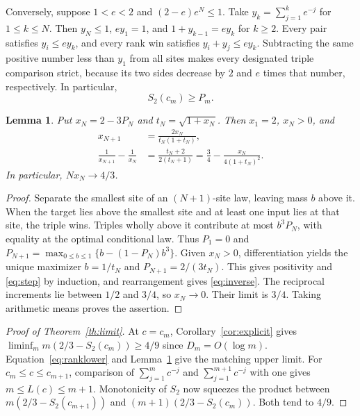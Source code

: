 \documentclass[11pt,reqno]{amsart}
\newtheorem{lemma}[theorem]{Lemma}
\begin{document}
Conversely, suppose $1<e<2$ and $(2-e)e^N\le1$. Take
$y_k=\sum_{j=1}^k e^{-j}$ for $1\le k\le N$. Then $y_N\le1$,
$e y_1=1$, and $1+y_{k-1}=e y_k$ for $k\ge2$.
Every pair satisfies $y_i\le e y_k$, and every rank win satisfies
$y_i+y_j\le e y_k$. Subtracting the same positive number less than
$y_1$ from all sites makes every designated triple comparison strict,
because its two sides decrease by $2$ and $e$ times that number,
respectively. In particular,
\begin{equation}\label{eq:ranklower}
 S_2(c_m)\ge P_m.
\end{equation}

\begin{lemma}\label{lem:rec}
Put $x_N=2-3P_N$ and $t_N=\sqrt{1+x_N}$. Then $x_1=2$,
$x_N>0$, and
\begin{align}
 x_{N+1}&=\frac{2x_N}{t_N(1+t_N)},\label{eq:step}\\
 \frac1{x_{N+1}}-\frac1{x_N}
  &=\frac{t_N+2}{2(t_N+1)}
   =\frac34-\frac{x_N}{4(1+t_N)^2}.\label{eq:inverse}
\end{align}
In particular, $Nx_N\longrightarrow 4/3$.
\end{lemma}
\begin{proof}
Separate the smallest site of an $(N+1)$-site law, leaving mass $b$
above it. When the target lies above the smallest site and at least one
input lies at that site, the triple wins. Triples wholly above it
contribute at most $b^3P_N$, with equality at the optimal conditional law.
Thus $P_1=0$ and
$P_{N+1}=\max_{0\le b\le1}\{b-(1-P_N)b^3\}$.
Given $x_N>0$, differentiation yields the unique maximizer
$b=1/t_N$ and $P_{N+1}=2/(3t_N)$. This gives positivity and
\eqref{eq:step} by induction, and rearrangement gives \eqref{eq:inverse}.
The reciprocal increments lie between $1/2$ and $3/4$, so $x_N\to0$.
Their limit is $3/4$. Taking arithmetic means proves the assertion.
\end{proof}

\begin{proof}[Proof of Theorem~\ref{th:limit}]
At $c=c_m$, Corollary~\ref{cor:explicit} gives
$\liminf_m m(2/3-S_2(c_m))\ge4/9$ since $D_m=O(\log m)$.
Equation~\eqref{eq:ranklower} and Lemma~\ref{lem:rec} give the
matching upper limit. For $c_m\le c\le c_{m+1}$, comparison of
$\sum_{j=1}^m c^{-j}$ and $\sum_{j=1}^{m+1}c^{-j}$ with one gives
$m\le L(c)\le m+1$. Monotonicity of $S_2$ now squeezes the product
between $m(2/3-S_2(c_{m+1}))$ and
$(m+1)(2/3-S_2(c_m))$. Both tend to $4/9$.
\end{proof}
\end{document}

